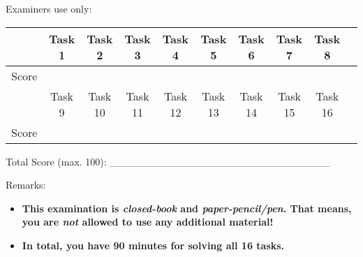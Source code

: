 \documentclass[UTF8]{ctexart}
\begin{document}
\newpage


Examiners use only:
\begin{center}
{\renewcommand{\arraystretch}{2.5}%
\begin{tabular}{|r|c|c|c|c|c|c|c|c|c|}
\hline
      & Task 1 & Task 2 & Task 3 & Task 4  & Task 5 & Task 6 & Task 7 & Task 8 \\
\hline
    Score & ~      & ~      & ~      & ~       & ~  & ~ & ~ & ~          \\
\hline
\hline
      & Task 9 & Task 10 & Task 11 & Task 12 & Task 13 & Task 14 & Task 15 &  Task 16   \\
\hline
    Score & ~      & ~      & ~      & ~       & ~  & ~ & ~ & ~  \\
\hline
    \end{tabular}
    }
\end{center}

\vspace{2cm}
Total Score (max. 100):  \_\_\_\_\_\_\_\_\_\_\_\_\_\_\_\_\_\_\_\_\_\_\_\_\_\_\_\_\_\_

\vspace{1cm}
Remarks:
\begin{itemize}
 \setlength{\itemsep}{0pt}
\item \textbf{This examination is \textit{closed-book} and \textit{paper-pencil/pen}. That means, you are \textit{not} allowed to use any additional material!}
\item \textbf{In total, you have 90 minutes for solving all 16 tasks.}
\end{itemize}
\end{document}
